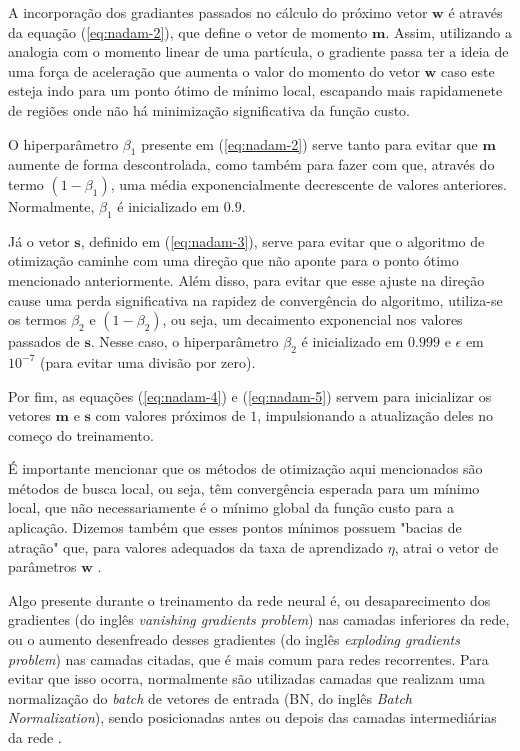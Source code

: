 \documentclass[a4paper, 12pt]{article}
\begin{document}
A incorporação dos gradiantes passados no cálculo do próximo vetor $\mathbf{w}$ é através da equação (\ref{eq:nadam-2}), que define o vetor de momento $\mathbf{m}$. Assim, utilizando a analogia com o momento linear de uma partícula, o gradiente passa ter a ideia de uma força de aceleração que aumenta o valor do momento do vetor $\mathbf{w}$ caso este esteja indo para um ponto ótimo de mínimo local, escapando mais rapidamenete de regiões onde não há minimização significativa da função custo.

O hiperparâmetro $\beta_1$ presente em (\ref{eq:nadam-2}) serve tanto para evitar que $\mathbf{m}$ aumente de forma descontrolada, como também para fazer com que, através do termo $(1 - \beta_1)$, uma média exponencialmente decrescente de valores anteriores. Normalmente, $\beta_1$ é inicializado em $0.9$.

Já o vetor $\mathbf{s}$, definido em (\ref{eq:nadam-3}), serve para evitar que o algoritmo de otimização caminhe com uma direção que não aponte para o ponto ótimo mencionado anteriormente. Além disso, para evitar que esse ajuste na direção cause uma perda significativa na rapidez de convergência do algoritmo, utiliza-se os termos $\beta_2$ e $(1 - \beta_2)$, ou seja, um decaimento exponencial nos valores passados de $\mathbf{s}$. Nesse caso, o hiperparâmetro $\beta_2$ é inicializado em $0.999$ e $\epsilon$ em $10^{-7}$ (para evitar uma divisão por zero).

Por fim, as equações (\ref{eq:nadam-4}) e (\ref{eq:nadam-5}) servem para inicializar os vetores $\mathbf{m}$ e $\mathbf{s}$ com valores próximos de $1$, impulsionando a atualização deles no começo do treinamento.

É importante mencionar que os métodos de otimização aqui mencionados são métodos de busca local, ou seja, têm convergência esperada para um mínimo local, que não necessariamente é o mínimo global da função custo para a aplicação. Dizemos também que esses pontos mínimos possuem "bacias de atração" que, para valores adequados da taxa de aprendizado $\eta$, atrai o vetor de parâmetros $\mathbf{w}$ \cite{hastie2009elements}.

Algo presente durante o treinamento da rede neural é, ou desaparecimento dos gradientes (do inglês \textit{vanishing gradients problem}) nas camadas inferiores da rede, ou o aumento desenfreado desses gradientes (do inglês \textit{exploding gradients problem}) nas camadas citadas, que é mais comum para redes recorrentes. Para evitar que isso ocorra, normalmente são utilizadas camadas que realizam uma normalização do \textit{batch} de vetores de entrada (BN, do inglês \textit{Batch Normalization}), sendo posicionadas antes ou depois das camadas intermediárias da rede \cite{geron2019hands}.
\end{document}
